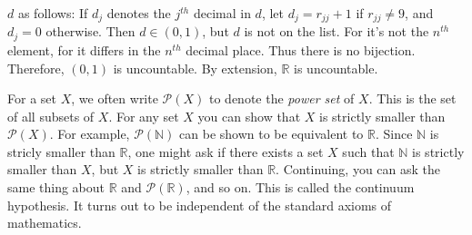             $d$ as follows: If $d_{j}$ denotes the $j^{th}$
            decimal in $d$, let $d_{j}=r_{jj}+1$ if
            $r_{jj}\ne{9}$, and $d_{j}=0$ otherwise. Then
            $d\in(0,1)$, but $d$ is not on the list. For it's not
            the $n^{th}$ element, for it differs in the
            $n^{th}$ decimal place. Thus there is no bijection.
            Therefore, $(0,1)$ is uncountable. By extension,
            $\mathbb{R}$ is uncountable.
            \par\hfill\par
            \vspace{-2ex}
            For a set $X$, we often write
            $\mathcal{P}(X)$ to denote the
            \textit{power set} of $X$. This is the
            set of all subsets of $X$.
            For any set $X$ you can show that $X$ is
            strictly smaller than $\mathcal{P}(X)$.
            For example, $\mathcal{P}(\mathbb{N})$
            can be shown to be equivalent to $\mathbb{R}$.
            Since $\mathbb{N}$ is stricly smaller than
            $\mathbb{R}$, one might ask if there exists
            a set $X$ such that $\mathbb{N}$ is strictly
            smaller than $X$, but $X$ is strictly smaller
            than $\mathbb{R}$. Continuing, you can ask the
            same thing about $\mathbb{R}$ and
            $\mathcal{P}(\mathbb{R})$, and so on.
            This is called the continuum hypothesis.
            It turns out to be independent of
            the standard axioms of mathematics.
